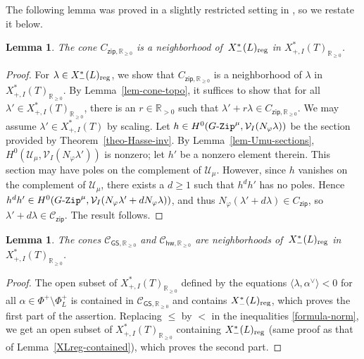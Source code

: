\documentclass[11pt]{amsart}
\numberwithin{equation}{section}
\newtheorem{lemma}[theorem]{Lemma}
\theoremstyle{definition}
\theoremstyle{remark}
\newcommand{\GZip}{\mathop{\text{$G$-{\tt Zip}}}\nolimits}
\newcommand{\zipsf}{\mathsf{zip}}
\newcommand{\GSsf}{\mathsf{GS}}
\newcommand{\hwsf}{\mathsf{hw}}
\newcommand{\Ccal}{{\mathcal C}}
\newcommand{\Ucal}{{\mathcal U}}
\newcommand{\Vcal}{{\mathcal V}}
\newcommand{\RR}{\mathbb{R}}
\newcommand{\reg}{{\rm reg}}
\begin{document}
The following lemma was proved in a slightly restricted setting in \cite[Proposition 2.2.1]{Koskivirta-automforms-GZip}, so we restate it below. 

\begin{lemma}\label{lemma-zip-neighborhood}
The cone $C_{\zipsf, \RR_{\geq 0}}$ is a neighborhood of\, $X^*_{-}(L)_{\reg}$ in $X^*_{+,I}(T)_{\RR_{\geq 0}}$.
\end{lemma}

\begin{proof}
For $\lambda \in X^*_{-}(L)_{\reg}$, we show that $C_{\zipsf, \RR_{\geq 0}}$ is a neighborhood of $\lambda$ in $X^*_{+,I}(T)_{\RR_{\geq 0}}$. 
By Lemma~\ref{lem-cone-topo}, it suffices to show that for all $\lambda'\in X^*_{+,I}(T)_{\RR_{\geq 0}}$, there is an $r\in \RR_{>0}$ such that $\lambda'+r\lambda \in C_{\zipsf, \RR_{\geq 0}}$. 
We may assume $\lambda'\in X^*_{+,I}(T)$ by scaling. 
Let $h\in H^0(\GZip^\mu,\Vcal_I(N_\varphi\lambda))$ be the section provided by Theorem~\ref{theo-Hasse-inv}. By Lemma~\ref{lem-Umu-sections}, $H^0(\Ucal_\mu,\Vcal_I(N_\varphi \lambda'))$ is nonzero; let $h'$ be a nonzero element therein. This section may have poles on the complement of $\Ucal_\mu$. However, since $h$ vanishes on the complement of $\Ucal_\mu$, there exists a $d\geq 1$ such that $h^d h'$ has no poles. Hence $h^d h'\in H^0(\GZip^\mu, \Vcal_I(N_{\varphi}\lambda' + d N_{\varphi} \lambda))$, and thus $N_{\varphi}(\lambda' + d \lambda) \in C_{\zipsf}$, so $\lambda'+ d\lambda \in \Ccal_{\zipsf}$. The result follows.
\end{proof}


\begin{lemma}\label{lemma-GS-hw-nbh}
The cones $\Ccal_{\GSsf,\RR_{\geq 0}}$ and $\Ccal_{\hwsf, \RR_{\geq 0}}$ are neighborhoods of\, $X^*_{-}(L)_{\reg}$ in $X^*_{+,I}(T)_{\RR_{\geq 0}}$.
\end{lemma}

\begin{proof}
The open subset of $X^*_{+,I}(T)_{\RR_{\geq 0}}$ defined by the equations $\langle \lambda, \alpha^\vee \rangle <0$ for all $\alpha\in \Phi^+ \setminus \Phi^{+}_{L}$ 
is contained in $\Ccal_{\GSsf,\RR_{\geq 0}}$ and contains $X^*_{-}(L)_{\reg}$, which proves the first part of the assertion. Replacing $\leq$ by $<$ in the inequalities \eqref{formula-norm}, we get an open subset of $X^*_{+,I}(T)_{\RR_{\geq 0}}$ containing $X^*_{-}(L)_{\reg}$ (same proof as that of Lemma~\ref{XLreg-contained}), which proves the second part. 
\end{proof}
\end{document}
